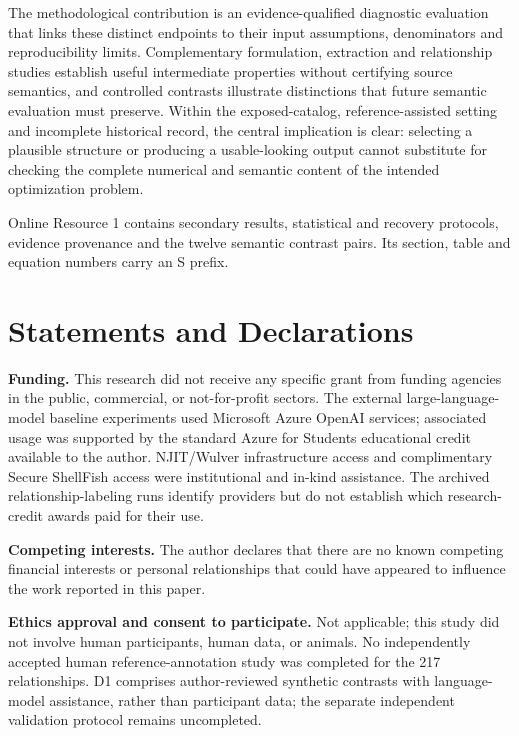 \documentclass[pdflatex,iicol,sn-basic,Numbered]{sn-jnl}
\begin{document}
The methodological contribution is an evidence-qualified diagnostic evaluation that links these distinct endpoints to their input assumptions, denominators and reproducibility limits. Complementary formulation, extraction and relationship studies establish useful intermediate properties without certifying source semantics, and controlled contrasts illustrate distinctions that future semantic evaluation must preserve. Within the exposed-catalog, reference-assisted setting and incomplete historical record, the central implication is clear: selecting a plausible structure or producing a usable-looking output cannot substitute for checking the complete numerical and semantic content of the intended optimization problem.
\backmatter

Online Resource 1 contains secondary results, statistical and recovery protocols, evidence provenance and the twelve semantic contrast pairs. Its section, table and equation numbers carry an S prefix.


\section*{Statements and Declarations}

\noindent\textbf{Funding.} This research did not receive any specific grant from funding agencies in the public, commercial, or not-for-profit sectors. The external large-language-model baseline experiments used Microsoft Azure OpenAI services; associated usage was supported by the standard Azure for Students educational credit available to the author. NJIT/Wulver infrastructure access and complimentary Secure ShellFish access were institutional and in-kind assistance. The archived relationship-labeling runs identify providers but do not establish which research-credit awards paid for their use.

\noindent\textbf{Competing interests.} The author declares that there are no known competing financial interests or personal relationships that could have appeared to influence the work reported in this paper.

\noindent\textbf{Ethics approval and consent to participate.} Not applicable; this study did not involve human participants, human data, or animals. No independently accepted human reference-annotation study was completed for the 217 relationships. D1 comprises author-reviewed synthetic contrasts with language-model assistance, rather than participant data; the separate independent validation protocol remains uncompleted.
\end{document}
